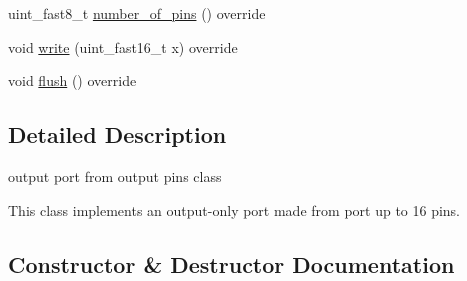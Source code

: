 \begin{DoxyCompactItemize}
uint\+\_\+fast8\+\_\+t \hyperlink{classhwlib_1_1port__out__from__pins__t_a781f5e1b62a7489f4e048b7314d84ab6}{number\+\_\+of\+\_\+pins} () override
\item 
void \hyperlink{classhwlib_1_1port__out__from__pins__t_a8d2a9ecce13e824b305a654675e572e5}{write} (uint\+\_\+fast16\+\_\+t x) override
\item 
void \hyperlink{classhwlib_1_1port__out__from__pins__t_a668e38b7d53d73d6ca3503ec4aa71bda}{flush} () override
\end{DoxyCompactItemize}


\subsection{Detailed Description}
output port from output pins class

This class implements an output-\/only port made from port up to 16 pins. 

\subsection{Constructor \& Destructor Documentation}
\mbox{\label{classhwlib_1_1port__out__from__pins__t_aae8ff8f951dc32353cf3aadb47d1a0c9}} 
